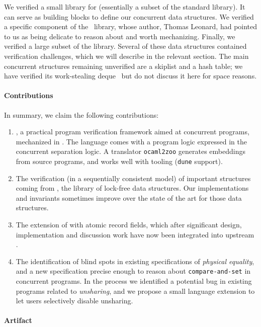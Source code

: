 We verified a small library for \ZooLang (essentially a subset of the \OCaml standard library).
It can serve as building blocks to define our concurrent data structures.
We verified a specific component of the \Eio~library, whose author, Thomas Leonard, had pointed to us as being delicate to reason about and worth mechanizing.
Finally, we verified a large subset of the \Saturn library.
Several of these data structures contained verification challenges, which we will describe in the relevant section.
The main \Saturn concurrent structures remaining unverified are a skiplist and a hash table; we have verified its work-stealing deque~\citep{DBLP:conf/spaa/ChaseL05} but do not discuss it here for space reasons.

\paragraph{Contributions}

In summary, we claim the following contributions:
\begin{enumerate}
  \item
    \Zoo, a practical program verification framework aimed at concurrent \OCaml programs, mechanized in \Rocq.
    The language \ZooLang comes with a program logic expressed in the \Iris concurrent separation logic.
    A translator \texttt{ocaml2zoo} generates \Rocq embeddings from source \OCaml programs, and works well with \OCaml tooling (\texttt{dune} support).
  \item
    The verification (in a sequentially consistent model) of important structures coming from \Saturn, the \OCamlFive library of lock-free data structures.
    Our implementations and invariants sometimes improve over the \Iris state of the art for those data structures.
  \item
    The extension of \OCaml with atomic record fields, which after significant design, implementation and discussion work have now been integrated into upstream \OCaml.
  \item
    The identification of blind spots in existing specifications of \emph{physical equality}, and a new specification precise enough to reason about \texttt{compare-and-set} in concurrent programs.
    In the process we identified a potential bug in existing \OCaml programs related to \emph{unsharing}, and we propose a small language extension to let users selectively disable unsharing.
\end{enumerate}

\paragraph{Artifact}

